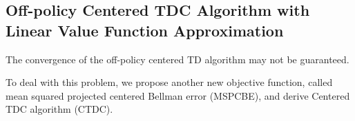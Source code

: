 \subsection{Off-policy Centered TDC Algorithm with Linear Value Function Approximation}
The convergence of the  off-policy centered TD algorithm
may not be guaranteed.

To deal with this problem, we propose another new objective function, 
called mean squared projected centered Bellman error (MSPCBE), 
and derive Centered TDC algorithm (CTDC).


